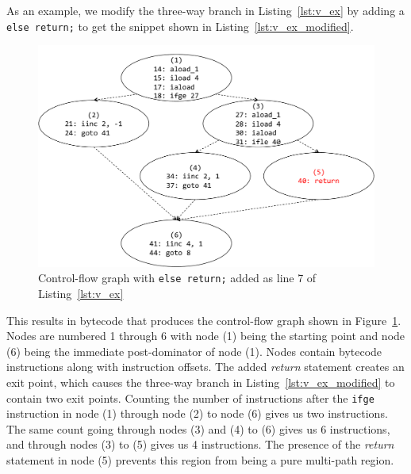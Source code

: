 As an example, we modify the three-way branch in Listing~\ref{lst:v_ex} by adding a {\tt else return;} to get the snippet shown in Listing~\ref{lst:v_ex_modified}.
%

%
\begin{figure}[]
\caption{Control-flow graph with {\tt else return;} added as line 7 of Listing~\ref{lst:v_ex}}
\label{fig:v_ex_cfg}
\includegraphics[width=\columnwidth]{figures/v_ex_cfg}
\end{figure}
%
This results in bytecode that produces the control-flow graph shown in Figure~\ref{fig:v_ex_cfg}.
%
Nodes are numbered 1 through 6 with node (1) being the starting point and node (6) being the immediate post-dominator of node (1).
%
Nodes contain bytecode instructions along with instruction offsets.
%
The added \textit{return} statement creates an exit point, which causes the three-way branch in Listing~\ref{lst:v_ex_modified} to contain two exit points.
%
Counting the number of instructions after the {\tt ifge} instruction in node (1) through node (2) to node (6) gives us two instructions.
%
The same count going through nodes (3) and (4) to (6) gives us 6 instructions, and through nodes (3) to (5) gives us 4 instructions.
%
The presence of the \textit{return} statement in node (5) prevents this region from being a pure multi-path region.
%
